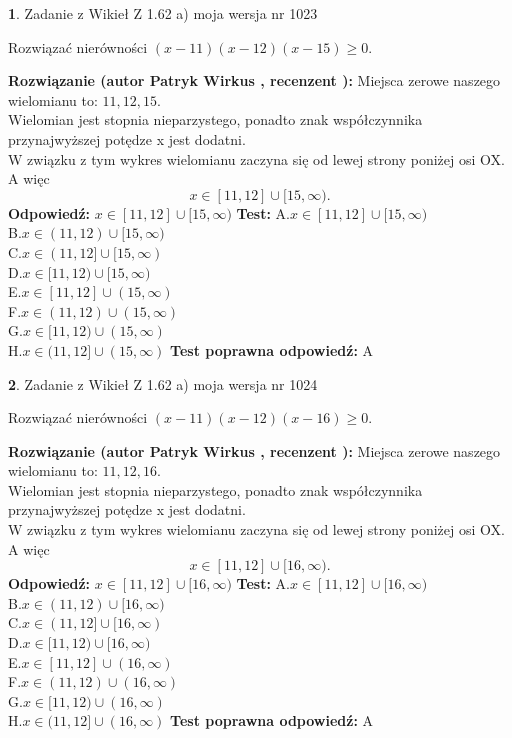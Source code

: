 \documentclass[12pt, a4paper]{article}
\theoremstyle{definition} %
\newtheorem{zad}{}
\newcommand{\zadStart}[1]{\begin{zad}#1\newline}
\newcommand{\zadStop}{\end{zad}}
\newcommand{\rozwStart}[2]{\noindent \textbf{Rozwiązanie (autor #1 , recenzent #2): }\newline}
\newcommand{\rozwStop}{\newline}
\newcommand{\odpStart}{\noindent \textbf{Odpowiedź:}\newline}
\newcommand{\odpStop}{\newline}
\newcommand{\testStart}{\noindent \textbf{Test:}\newline}
\newcommand{\testStop}{\newline}
\newcommand{\kluczStart}{\noindent \textbf{Test poprawna odpowiedź:}\newline}
\newcommand{\kluczStop}{\newline}
\begin{document}
\zadStart{Zadanie z Wikieł Z 1.62 a) moja wersja nr 1023}

Rozwiązać nierówności $(x-11)(x-12)(x-15)\ge0$.
\zadStop
\rozwStart{Patryk Wirkus}{}
Miejsca zerowe naszego wielomianu to: $11, 12, 15$.\\
Wielomian jest stopnia nieparzystego, ponadto znak współczynnika przy\linebreak najwyższej potędze x jest dodatni.\\ W związku z tym wykres wielomianu zaczyna się od lewej strony poniżej osi OX. A więc $$x \in [11,12] \cup [15,\infty).$$
\rozwStop
\odpStart
$x \in [11,12] \cup [15,\infty)$
\odpStop
\testStart
A.$x \in [11,12] \cup [15,\infty)$\\
B.$x \in (11,12) \cup [15,\infty)$\\
C.$x \in (11,12] \cup [15,\infty)$\\
D.$x \in [11,12) \cup [15,\infty)$\\
E.$x \in [11,12] \cup (15,\infty)$\\
F.$x \in (11,12) \cup (15,\infty)$\\
G.$x \in [11,12) \cup (15,\infty)$\\
H.$x \in (11,12] \cup (15,\infty)$
\testStop
\kluczStart
A
\kluczStop



\zadStart{Zadanie z Wikieł Z 1.62 a) moja wersja nr 1024}

Rozwiązać nierówności $(x-11)(x-12)(x-16)\ge0$.
\zadStop
\rozwStart{Patryk Wirkus}{}
Miejsca zerowe naszego wielomianu to: $11, 12, 16$.\\
Wielomian jest stopnia nieparzystego, ponadto znak współczynnika przy\linebreak najwyższej potędze x jest dodatni.\\ W związku z tym wykres wielomianu zaczyna się od lewej strony poniżej osi OX. A więc $$x \in [11,12] \cup [16,\infty).$$
\rozwStop
\odpStart
$x \in [11,12] \cup [16,\infty)$
\odpStop
\testStart
A.$x \in [11,12] \cup [16,\infty)$\\
B.$x \in (11,12) \cup [16,\infty)$\\
C.$x \in (11,12] \cup [16,\infty)$\\
D.$x \in [11,12) \cup [16,\infty)$\\
E.$x \in [11,12] \cup (16,\infty)$\\
F.$x \in (11,12) \cup (16,\infty)$\\
G.$x \in [11,12) \cup (16,\infty)$\\
H.$x \in (11,12] \cup (16,\infty)$
\testStop
\kluczStart
A
\kluczStop
\end{document}
